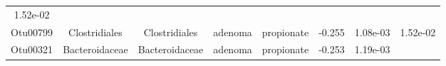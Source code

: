 \documentclass[11pt,]{article}
\begin{document}
\begin{longtable}[]{@{}cccccccc@{}}
\begin{minipage}[t]{0.08\columnwidth}
1.52e-02\strut
\end{minipage}\tabularnewline
\begin{minipage}[t]{0.08\columnwidth}\centering\strut
Otu00799\strut
\end{minipage} & \begin{minipage}[t]{0.15\columnwidth}\centering\strut
Clostridiales\strut
\end{minipage} & \begin{minipage}[t]{0.15\columnwidth}\centering\strut
Clostridiales\strut
\end{minipage} & \begin{minipage}[t]{0.08\columnwidth}\centering\strut
adenoma\strut
\end{minipage} & \begin{minipage}[t]{0.09\columnwidth}\centering\strut
propionate\strut
\end{minipage} & \begin{minipage}[t]{0.07\columnwidth}\centering\strut
-0.255\strut
\end{minipage} & \begin{minipage}[t]{0.08\columnwidth}\centering\strut
1.08e-03\strut
\end{minipage} & \begin{minipage}[t]{0.08\columnwidth}\centering\strut
1.52e-02\strut
\end{minipage}\tabularnewline
\begin{minipage}[t]{0.08\columnwidth}\centering\strut
Otu00321\strut
\end{minipage} & \begin{minipage}[t]{0.15\columnwidth}\centering\strut
Bacteroidaceae\strut
\end{minipage} & \begin{minipage}[t]{0.15\columnwidth}\centering\strut
Bacteroidaceae\strut
\end{minipage} & \begin{minipage}[t]{0.08\columnwidth}\centering\strut
adenoma\strut
\end{minipage} & \begin{minipage}[t]{0.09\columnwidth}\centering\strut
propionate\strut
\end{minipage} & \begin{minipage}[t]{0.07\columnwidth}\centering\strut
-0.253\strut
\end{minipage} & \begin{minipage}[t]{0.08\columnwidth}\centering\strut
1.19e-03\strut
\end{minipage} & \begin{minipage}[t]{0.08\columnwidth}\centering\strut

\end{minipage}
\end{longtable}
\end{document}
